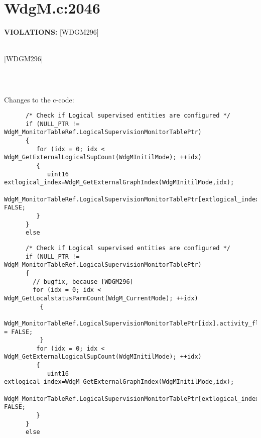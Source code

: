 \documentclass[11pt,a4paper]{article}
\begin{document}
\section{WdgM.c:2046}
\textbf{VIOLATIONS:} [WDGM296]\\[0.5cm]

\lstset{language=autosar}

\\

[WDGM296]
\begin{lstlisting}
\end{lstlisting}~\\

\lstset{language=c}

Changes to the c-code:
\begin{lstlisting}
      /* Check if Logical supervised entities are configured */
      if (NULL_PTR != WdgM_MonitorTableRef.LogicalSupervisionMonitorTablePtr)
      {
         for (idx = 0; idx < WdgM_GetExternalLogicalSupCount(WdgMInitilMode); ++idx)
         {
            uint16 extlogical_index=WdgM_GetExternalGraphIndex(WdgMInitilMode,idx);
            WdgM_MonitorTableRef.LogicalSupervisionMonitorTablePtr[extlogical_index].activity_flag= FALSE;
         }
      }
      else
\end{lstlisting}
\begin{lstlisting}
      /* Check if Logical supervised entities are configured */
      if (NULL_PTR != WdgM_MonitorTableRef.LogicalSupervisionMonitorTablePtr)
      {
        // bugfix, because [WDGM296]
        for (idx = 0; idx < WdgM_GetLocalstatusParmCount(WdgM_CurrentMode); ++idx)
          {
            WdgM_MonitorTableRef.LogicalSupervisionMonitorTablePtr[idx].activity_flag = FALSE;
          }
         for (idx = 0; idx < WdgM_GetExternalLogicalSupCount(WdgMInitilMode); ++idx)
         {
            uint16 extlogical_index=WdgM_GetExternalGraphIndex(WdgMInitilMode,idx);
            WdgM_MonitorTableRef.LogicalSupervisionMonitorTablePtr[extlogical_index].activity_flag= FALSE;
         }
      }
      else
\end{lstlisting}
\newpage

\end{document}
